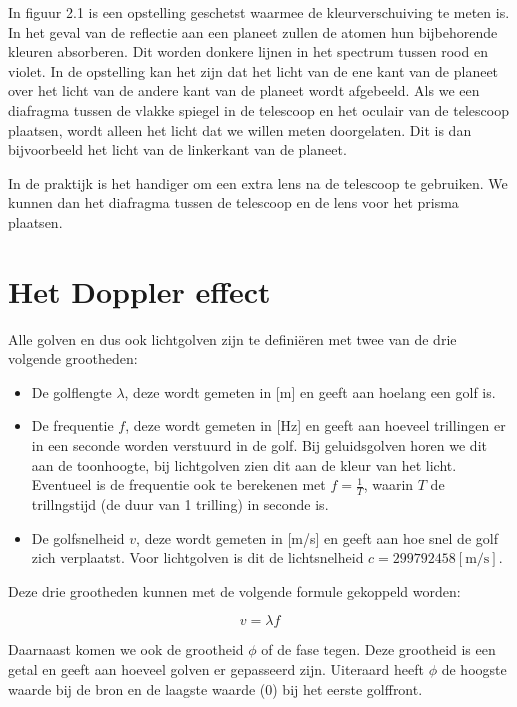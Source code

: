 In figuur 2.1 is een opstelling geschetst waarmee de kleurverschuiving
te meten is. In het geval van de reflectie aan een planeet zullen
de atomen hun bijbehorende kleuren absorberen. Dit worden donkere
lijnen in het spectrum tussen rood en violet. In de opstelling kan
het zijn dat het licht van de ene kant van de planeet over het licht
van de andere kant van de planeet wordt afgebeeld. Als we een diafragma
tussen de vlakke spiegel in de telescoop en het oculair van de telescoop
plaatsen, wordt alleen het licht dat we willen meten doorgelaten.
Dit is dan bijvoorbeeld het licht van de linkerkant van de planeet.

In de praktijk is het handiger om een extra lens na de telescoop te
gebruiken. We kunnen dan het diafragma tussen de telescoop en de lens
voor het prisma plaatsen.


\section{Het Doppler effect}

Alle golven en dus ook lichtgolven zijn te definiëren met twee van
de drie volgende grootheden:
\begin{itemize}
\item De golflengte $\lambda$, deze wordt gemeten in {[}m{]} en geeft aan
hoelang een golf is.
\item De frequentie $f$, deze wordt gemeten in {[}Hz{]} en geeft aan hoeveel
trillingen er in een seconde worden verstuurd in de golf. Bij geluidsgolven
horen we dit aan de toonhoogte, bij lichtgolven zien dit aan de kleur
van het licht. Eventueel is de frequentie ook te berekenen met $f=\frac{1}{T}$,
waarin $T$ de trillngstijd (de duur van 1 trilling) in seconde is.
\item De golfsnelheid $v$, deze wordt gemeten in {[}m/s{]} en geeft aan
hoe snel de golf zich verplaatst. Voor lichtgolven is dit de lichtsnelheid
$c=299792458[\mathrm{m/s}]$.
\end{itemize}
Deze drie grootheden kunnen met de volgende formule gekoppeld worden:

\begin{equation}
v=\lambda f
\end{equation}


Daarnaast komen we ook de grootheid $\phi$ of de fase tegen. Deze
grootheid is een getal en geeft aan hoeveel golven er gepasseerd zijn.
Uiteraard heeft $\phi$ de hoogste waarde bij de bron en de laagste
waarde (0) bij het eerste golffront.


